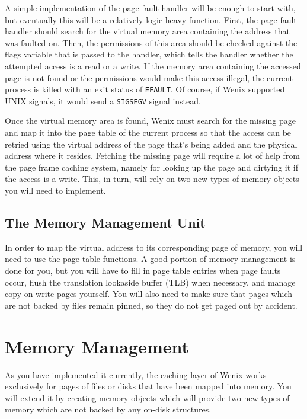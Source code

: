 A simple implementation of the page fault handler will be enough to start with, but eventually this will be a relatively logic-heavy function. First, the page fault handler should search for the virtual memory area containing the address that was faulted on. Then, the permissions of this area should be checked against the flags variable that is passed to the handler, which tells the handler whether the attempted access is a read or a write. If the memory area containing the accessed page is not found or the permissions would make this access illegal, the current process is killed with an exit status of \texttt{EFAULT}. Of course, if Wenix supported UNIX signals, it would send a \texttt{SIGSEGV} signal instead.

Once the virtual memory area is found, Wenix must search for the missing page and map it into the page table of the current process so that the access can be retried using the virtual address of the page that's being added and the physical address where it resides. Fetching the missing page will require a lot of help from the page frame caching system, namely for looking up the page and dirtying it if the access is a write. This, in turn, will rely on two new types of memory objects you will need to implement.

\subsection{The Memory Management Unit}

In order to map the virtual address to its corresponding page of memory, you will need to use the page table functions. A good portion of memory management is done for you, but you will have to fill in page table entries when page faults occur, flush the translation lookaside buffer (TLB) when necessary, and manage copy-on-write pages yourself. You will also need to make sure that pages which are not backed by files remain pinned, so they do not get paged out by accident.

\section{Memory Management}

As you have implemented it currently, the caching layer of Wenix works exclusively for pages of files or disks that have been mapped into memory. You will extend it by creating memory objects which will provide two new types of memory which are not backed by any on-disk structures.

